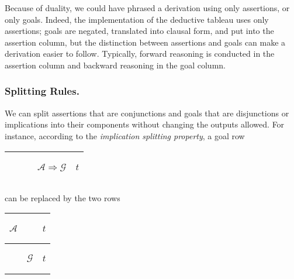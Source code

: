 \documentclass[runningheads]{llncs}
\DeclareMathOperator{\uimplies}{\Rightarrow}
\begin{document}
Because of duality, we could have phrased a derivation using only assertions, or only goals.  Indeed, the {\SNARK}  implementation of the deductive tableau uses only assertions; goals are negated, translated into clausal form, and put into the assertion column, but the distinction between assertions and goals can make a derivation easier to follow. Typically, forward reasoning is conducted in the assertion column and backward reasoning in the goal column.


\subsubsection{Splitting Rules.} We can split assertions that are conjunctions and goals that are disjunctions or implications into their components without changing the outputs allowed.  For instance, according to the \emph{implication splitting property}, a goal row 


 \begin{center}
\begin{tabular}{T}
\hline
 \begin{center}$\qquad$\end{center}  &  \begin{center}$\mathcal{A}\uimplies\mathcal{G}$\end{center} & \begin{center}$t$\end{center} \\
  \hline
\end{tabular}
\end{center}

\noindent can be replaced by the two rows


 \begin{center}
\begin{tabular}{T}
\hline
 \begin{center}$\mathcal{A}$\end{center} &   \qquad & \begin{center} $t$ \end{center} \\
  \hline
     &  \begin{center}$ \mathcal{G}$ \end{center} & \begin{center}$t$\end{center} \\
  \hline
\end{tabular}
\end{center}
\end{document}
